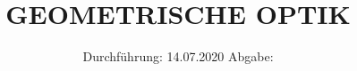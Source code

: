 

\subject{V408}
\title{GEOMETRISCHE OPTIK}
\date{%
  Durchführung: 14.07.2020
  \hspace{3em}
  Abgabe: 
}



\maketitle
\thispagestyle{empty}
\tableofcontents
\newpage







\printbibliography{}



